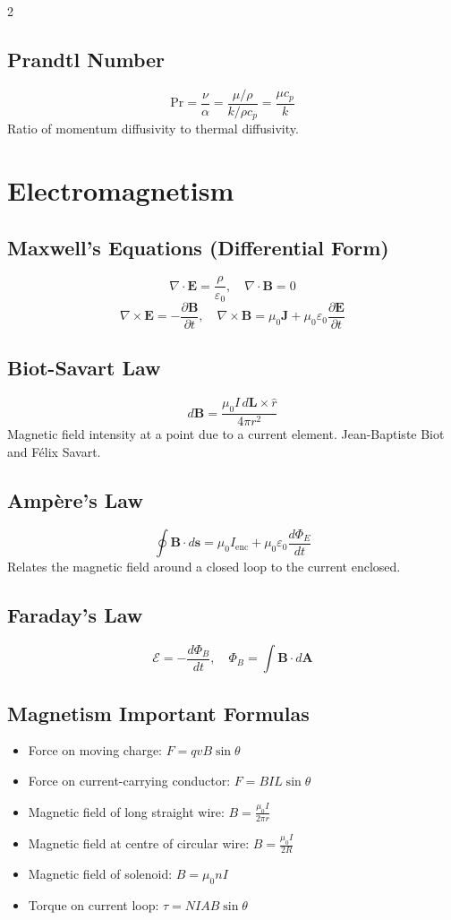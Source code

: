 \documentclass[10pt,a4paper]{article}
\begin{document}
\begin{multicols}{2}
\subsection{Prandtl Number}
\[
\text{Pr} = \frac{\nu}{\alpha} = \frac{\mu/\rho}{k/\rho c_p} = \frac{\mu c_p}{k}
\]
Ratio of momentum diffusivity to thermal diffusivity.

\section{Electromagnetism}

\subsection{Maxwell's Equations (Differential Form)}
\[
\nabla\cdot\mathbf{E} = \frac{\rho}{\varepsilon_0}, \quad \nabla\cdot\mathbf{B} = 0
\]
\[
\nabla\times\mathbf{E} = -\frac{\partial\mathbf{B}}{\partial t}, \quad \nabla\times\mathbf{B} = \mu_0\mathbf{J} + \mu_0\varepsilon_0\frac{\partial\mathbf{E}}{\partial t}
\]

\subsection{Biot-Savart Law}
\[
d\mathbf{B} = \frac{\mu_0 I\,d\mathbf{L}\times\hat{r}}{4\pi r^2}
\]
Magnetic field intensity at a point due to a current element. Jean-Baptiste Biot and F\'elix Savart.

\subsection{Amp\`ere's Law}
\[
\oint \mathbf{B}\cdot d\mathbf{s} = \mu_0 I_\text{enc} + \mu_0\varepsilon_0\frac{d\Phi_E}{dt}
\]
Relates the magnetic field around a closed loop to the current enclosed.

\subsection{Faraday's Law}
\[
\mathcal{E} = -\frac{d\Phi_B}{dt}, \quad \Phi_B = \int \mathbf{B}\cdot d\mathbf{A}
\]

\subsection{Magnetism Important Formulas}
\begin{itemize}
\item Force on moving charge: $F = qvB\sin\theta$
\item Force on current-carrying conductor: $F = BIL\sin\theta$
\item Magnetic field of long straight wire: $B = \frac{\mu_0 I}{2\pi r}$
\item Magnetic field at centre of circular wire: $B = \frac{\mu_0 I}{2R}$
\item Magnetic field of solenoid: $B = \mu_0 nI$
\item Torque on current loop: $\tau = NIAB\sin\theta$
\end{itemize}


\end{multicols}
\end{document}
